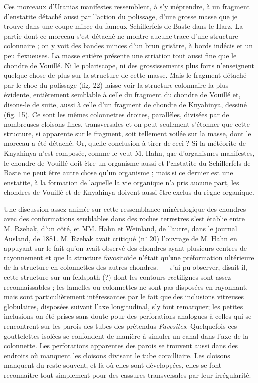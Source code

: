 \documentclass[a4paper, 12pt, oneside, french]{article}
\begin{document}
Ces morceaux d'Uranias manifestes ressemblent, à s'y méprendre, à un fragment d'enstatite détaché aussi par l'action du polissage, d'une grosse masse que je trouve dans une coupe mince du fameux \og Schillerfels \fg de Baste dans le Harz. La partie dont ce morceau s'est détaché ne montre aucune trace d'une structure colonnaire ; on y voit des bandes minces d'un brun grisâtre, à bords indécis et un peu flexueuses. La masse entière présente une striation tout aussi fine que le chondre de Vouillé. Ni le polariscope, ni des grossissements plus forts n'enseignent quelque chose de plus sur la structure de cette masse. Mais le fragment détaché par le choc du polissage (fig. 22) laisse voir la structure colonnaire la plus évidente, entièrement semblable à celle du fragment du chondre de Vouillé et, disons-le de suite, aussi à celle d'un fragment de chondre de Knyahinya, dessiné (fig. 15). Ce sont les mêmes colonnettes droites, parallèles, divisées par de nombreuses cloisons fines, transversales et on peut seulement s'étonner que cette structure, si apparente sur le fragment, soit tellement voilée sur la masse, dont le morceau a été détaché. Or, quelle conclusion à tirer de ceci ? Si la météorite de Knyahinya n'est composée, comme le veut M. Hahn, que d'organismes manifestes, le chondre de Vouillé doit être un organisme aussi et l'enstatite du Schillerfels de Baste ne peut être autre chose qu'un organisme ; mais si ce dernier est une enstatite, à la formation de laquelle la vie organique n'a pris aucune part, les chondres de Vouillé et de Knyahinya doivent aussi être exclus du règne organique.

Une discussion assez animée sur cette ressemblance minéralogique des chondres avec des conformations semblables dans des roches terrestres s'est établie entre M. Rzehak, d'un côté, et MM. Hahn et Weinland, de l'autre, dans le journal Ausland, de 1881. M. Rzehak avait critiqué (n$^{\circ}$ 20) l'ouvrage de M. Hahn en appuyant sur le fait qu'on avait observé des chondres ayant plusieurs centres de rayonnement et que la structure \og favositoïde \fg n'était qu'une préformation ultérieure de la structure en colonnettes des autres chondres. --- \og J'ai pu observer, disait-il, cette structure sur un feldspath (?) dont les contours rectilignes sont assez reconnaissables ; les lamelles ou colonnettes ne sont pas disposées en rayonnant, mais sont particulièrement intéressantes par le fait que des inclusions vitreuses globulaires, disposées suivant l'axe longitudinal, s'y font remarquer; les petites inclusions on été prises sans doute pour des perforations analogues à celles qui se rencontrent sur les parois des tubes des prétendus \emph{Favosites}. Quelquefois ces gouttelettes isolées se confondent de manière à simuler un canal dans l'axe de la colonnette. Les perforations apparentes des parois se trouvent aussi dans des endroits où manquent les cloisons divisant le tube corailliaire. Les cloisons manquent du reste souvent, et là où elles sont développées, elles se font reconnaître tout simplement pour des cassures transversales par leur irrégularité. \fg
\end{document}
